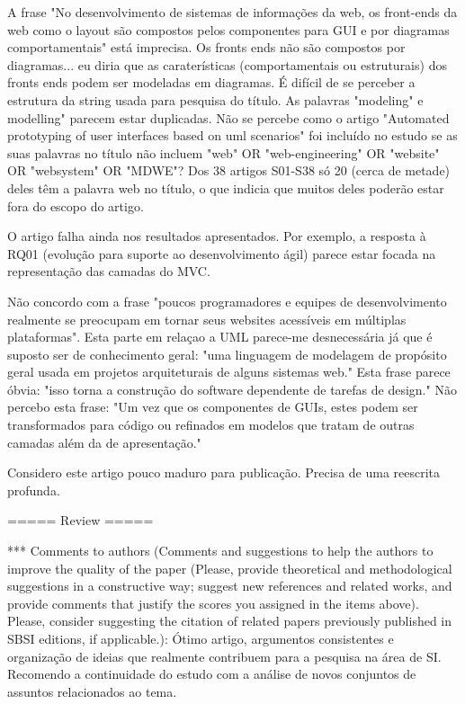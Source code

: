 A frase "No desenvolvimento de sistemas de informações da web, os
front-ends da web como o layout são compostos pelos componentes para GUI
e por diagramas comportamentais" está imprecisa. Os fronts ends não são
compostos por diagramas... eu diria que as caraterísticas
(comportamentais ou estruturais) dos fronts ends podem ser modeladas em
diagramas. É difícil de se perceber a estrutura da string usada para
pesquisa do título. As palavras "modeling" e modelling" parecem estar
duplicadas. Não se percebe como o artigo "Automated prototyping of user
interfaces based on uml scenarios" foi incluído no estudo se as suas
palavras no título não incluem "web" OR "web-engineering" OR "website"
OR "websystem" OR "MDWE"? Dos 38 artigos S01-S38 só 20 (cerca de metade)
deles têm a palavra web no título, o que indicia que muitos deles
poderão estar fora do escopo do artigo.

O artigo falha ainda nos resultados apresentados. Por exemplo, a
resposta à RQ01 (evolução para suporte ao desenvolvimento ágil) parece 
estar focada na representação das camadas do MVC.

Não concordo com a frase "poucos programadores e equipes de
desenvolvimento realmente se preocupam em tornar seus websites
acessíveis em múltiplas plataformas". Esta parte em relaçao a UML
parece-me desnecessária já que é suposto ser de conhecimento geral: "uma
linguagem de modelagem de propósito geral usada em projetos
arquiteturais de alguns sistemas web." Esta frase parece óbvia: "isso
torna a construção do software dependente de tarefas de design." Não
percebo esta frase: "Um vez que os componentes de GUIs, estes podem ser
transformados para código ou refinados em modelos que tratam de outras
camadas além da de apresentação."

Considero este artigo pouco maduro para publicação. Precisa de uma
reescrita profunda.


===== Review =====


*** Comments to authors (Comments and suggestions to help the authors to
improve the quality of the paper (Please, provide theoretical and
methodological suggestions in a constructive way; suggest new references
and related works, and provide comments that justify the scores you
assigned in the items above). Please, consider suggesting the citation
of related papers previously published in SBSI editions, if
applicable.): Ótimo artigo, argumentos consistentes e organização de
ideias que realmente contribuem para a pesquisa na área de SI. Recomendo
a continuidade do estudo com a análise de novos conjuntos de assuntos
relacionados ao tema.